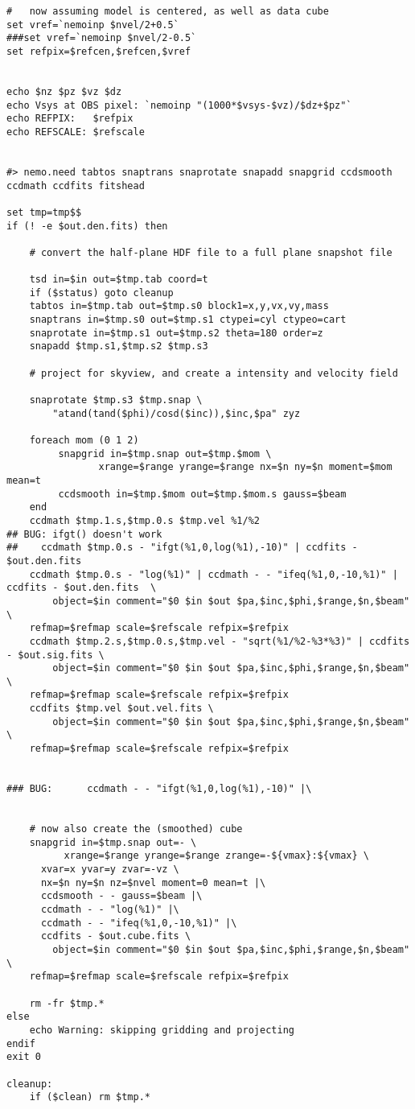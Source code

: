 \documentclass[11pt]{article}
\begin{document}
\begin{verbatim}
#   now assuming model is centered, as well as data cube
set vref=`nemoinp $nvel/2+0.5`
###set vref=`nemoinp $nvel/2-0.5`
set refpix=$refcen,$refcen,$vref


echo $nz $pz $vz $dz 
echo Vsys at OBS pixel: `nemoinp "(1000*$vsys-$vz)/$dz+$pz"` 
echo REFPIX:   $refpix
echo REFSCALE: $refscale


#> nemo.need tabtos snaptrans snaprotate snapadd snapgrid ccdsmooth ccdmath ccdfits fitshead

set tmp=tmp$$
if (! -e $out.den.fits) then

    # convert the half-plane HDF file to a full plane snapshot file

    tsd in=$in out=$tmp.tab coord=t
    if ($status) goto cleanup
    tabtos in=$tmp.tab out=$tmp.s0 block1=x,y,vx,vy,mass
    snaptrans in=$tmp.s0 out=$tmp.s1 ctypei=cyl ctypeo=cart
    snaprotate in=$tmp.s1 out=$tmp.s2 theta=180 order=z
    snapadd $tmp.s1,$tmp.s2 $tmp.s3

    # project for skyview, and create a intensity and velocity field

    snaprotate $tmp.s3 $tmp.snap \
        "atand(tand($phi)/cosd($inc)),$inc,$pa" zyz

    foreach mom (0 1 2)
         snapgrid in=$tmp.snap out=$tmp.$mom \
                xrange=$range yrange=$range nx=$n ny=$n moment=$mom mean=t
         ccdsmooth in=$tmp.$mom out=$tmp.$mom.s gauss=$beam
    end
    ccdmath $tmp.1.s,$tmp.0.s $tmp.vel %1/%2
## BUG: ifgt() doesn't work
##    ccdmath $tmp.0.s - "ifgt(%1,0,log(%1),-10)" | ccdfits - $out.den.fits
    ccdmath $tmp.0.s - "log(%1)" | ccdmath - - "ifeq(%1,0,-10,%1)" | ccdfits - $out.den.fits  \
        object=$in comment="$0 $in $out $pa,$inc,$phi,$range,$n,$beam"  \
	refmap=$refmap scale=$refscale refpix=$refpix
    ccdmath $tmp.2.s,$tmp.0.s,$tmp.vel - "sqrt(%1/%2-%3*%3)" | ccdfits - $out.sig.fits \
        object=$in comment="$0 $in $out $pa,$inc,$phi,$range,$n,$beam" 	\
	refmap=$refmap scale=$refscale refpix=$refpix
    ccdfits $tmp.vel $out.vel.fits \
        object=$in comment="$0 $in $out $pa,$inc,$phi,$range,$n,$beam" 	\
	refmap=$refmap scale=$refscale refpix=$refpix


### BUG:      ccdmath - - "ifgt(%1,0,log(%1),-10)" |\


    # now also create the (smoothed) cube
    snapgrid in=$tmp.snap out=- \
          xrange=$range yrange=$range zrange=-${vmax}:${vmax} \
	  xvar=x yvar=y zvar=-vz \
	  nx=$n ny=$n nz=$nvel moment=0 mean=t |\
      ccdsmooth - - gauss=$beam |\
      ccdmath - - "log(%1)" |\
      ccdmath - - "ifeq(%1,0,-10,%1)" |\
      ccdfits - $out.cube.fits \
        object=$in comment="$0 $in $out $pa,$inc,$phi,$range,$n,$beam" \
	refmap=$refmap scale=$refscale refpix=$refpix

    rm -fr $tmp.*
else
    echo Warning: skipping gridding and projecting
endif
exit 0

cleanup:
    if ($clean) rm $tmp.*

\end{verbatim}\normalsize
\end{document}
